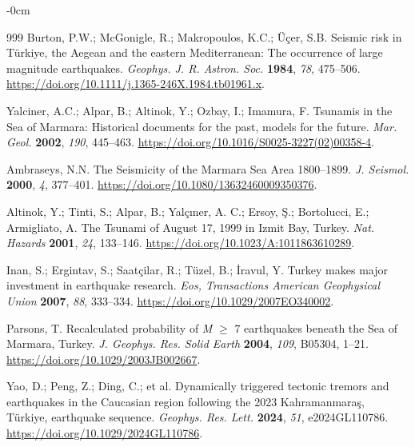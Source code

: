 \documentclass[data,article,accept,pdftex,moreauthors]{Definitions/mdpi}
\begin{document}
\begin{adjustwidth}{-\extralength}{0cm}
\begin{thebibliography}{999}
Burton, P.W.; McGonigle, R.; Makropoulos, K.C.; Üçer, S.B. Seismic risk in Türkiye, the Aegean and the eastern Mediterranean: The occurrence of large magnitude earthquakes. \emph{Geophys. J. R. Astron. Soc.} \textbf{1984}, \emph{78}, 475--506. \url{https://doi.org/10.1111/j.1365-246X.1984.tb01961.x}.

Yalciner, A.C.; Alpar, B.; Altinok, Y.; Ozbay, I.; Imamura, F. Tsunamis in the Sea of Marmara: Historical documents for the past, models for the future. \emph{Mar. Geol.} \textbf{2002}, \emph{190}, 445--463. \url{https://doi.org/10.1016/S0025-3227(02)00358-4}. %

Ambraseys, N.N. The Seismicity of the Marmara Sea Area 1800--1899. \emph{J. Seismol.} \textbf{2000}, \emph{4}, 377--401. \url{https://doi.org/10.1080/13632460009350376}. %

Altinok, Y.; Tinti, S.; Alpar, B.; Yalçıner, A. C.; Ersoy, Ş.; Bortolucci, E.; Armigliato, A. The Tsunami of August 17, 1999 in Izmit Bay, Turkey. \emph{Nat. Hazards} \textbf{2001}, \emph{24}, 133--146. \url{https://doi.org/10.1023/A:1011863610289}. %

Inan, S.; Ergintav, S.; Saatçilar, R.; Tüzel, B.; İravul, Y. Turkey makes major investment in earthquake research. \emph{Eos, Transactions American Geophysical Union} \textbf{2007}, \emph{88}, 333--334. \url{https://doi.org/10.1029/2007EO340002}. %

Parsons, T. Recalculated probability of \emph{M} $\geq$ 7 earthquakes beneath the Sea of Marmara, Turkey. \emph{J. Geophys. Res. Solid Earth} \textbf{2004}, \emph{109}, B05304, 1--21. %
\url{https://doi.org/10.1029/2003JB002667}.

Yao, D.; Peng, Z.; Ding, C.; et al. Dynamically triggered tectonic tremors and earthquakes in the Caucasian region following the 2023 Kahramanmara\c{s}, Türkiye, earthquake sequence. \emph{Geophys. Res. Lett.} \textbf{2024}, \emph{51}, e2024GL110786. \url{https://doi.org/10.1029/2024GL110786}.


\end{thebibliography}
\end{adjustwidth}
\end{document}
